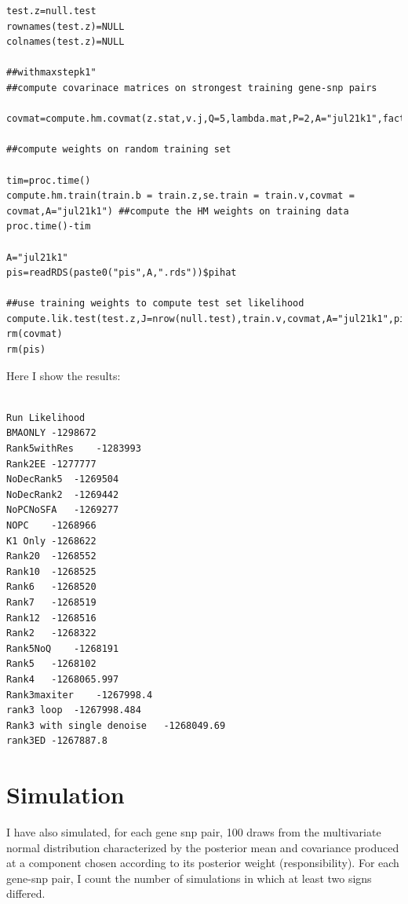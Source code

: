 \documentclass[10pt]{article}
\begin{document}
\begin{itemize}
\begin{verbatim}
test.z=null.test
rownames(test.z)=NULL
colnames(test.z)=NULL

##withmaxstepk1"
##compute covarinace matrices on strongest training gene-snp pairs

covmat=compute.hm.covmat(z.stat,v.j,Q=5,lambda.mat,P=2,A="jul21k1",factor.mat,max.step=max.stepk1)

##compute weights on random training set

tim=proc.time()
compute.hm.train(train.b = train.z,se.train = train.v,covmat = covmat,A="jul21k1") ##compute the HM weights on training data
proc.time()-tim

A="jul21k1"
pis=readRDS(paste0("pis",A,".rds"))$pihat

##use training weights to compute test set likelihood
compute.lik.test(test.z,J=nrow(null.test),train.v,covmat,A="jul21k1",pis) 
rm(covmat)
rm(pis)
\end{verbatim}

Here I show the results:



\begin{verbatim}

Run	Likelihood
BMAONLY	-1298672
Rank5withRes	-1283993
Rank2EE	-1277777
NoDecRank5	-1269504
NoDecRank2	-1269442
NoPCNoSFA	-1269277
NOPC	-1268966
K1 Only	-1268622
Rank20	-1268552
Rank10	-1268525
Rank6	-1268520
Rank7	-1268519
Rank12	-1268516
Rank2	-1268322
Rank5NoQ	-1268191
Rank5	-1268102
Rank4	-1268065.997
Rank3maxiter	-1267998.4
rank3 loop 	-1267998.484
Rank3 with single denoise	-1268049.69
rank3ED	-1267887.8

\end{verbatim}

\section{Simulation}
I have also simulated, for each gene snp pair, 100 draws from the multivariate normal distribution characterized by the posterior mean and covariance produced at a component chosen according to its posterior weight (responsibility). For each gene-snp pair, I count the number of simulations in which at least two signs differed. 


\end{itemize}
\end{document}
